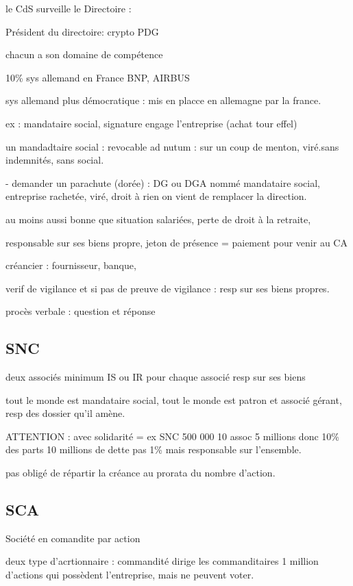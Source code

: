 \documentclass[a4paper,12pt]{article}
\begin{document}
le CdS surveille le Directoire : 

Président du directoire: crypto PDG

chacun a son domaine de compétence

10\% sys allemand en France
BNP, AIRBUS

sys allemand plus démocratique : mis en placce en allemagne par la france.


ex : mandataire social, signature engage l'entreprise (achat tour effel)

un mandadtaire social : revocable ad nutum : sur un coup de menton, viré.sans indemnités, sans social.

- demander un parachute (dorée) :  DG ou DGA nommé mandataire social, entreprise rachetée, viré, droit à rien
on vient de remplacer la direction.

au moins aussi bonne que situation salariées, perte de droit à la retraite,

responsable sur ses biens propre, jeton de présence = paiement pour venir au CA

créancier : fournisseur,  banque,

verif de vigilance et si pas de preuve de vigilance : resp sur ses biens propres. 

procès verbale : question et réponse     

\subsection{SNC}


deux associés minimum
IS ou IR pour chaque associé
resp sur ses biens 

tout le monde est mandataire social, tout le monde est patron et associé gérant,
resp des dossier qu'il amène.


ATTENTION : avec solidarité = ex SNC 500 000 10 assoc 5 millions donc 10\% des parts
10 millions de dette pas 1\% mais responsable sur l'ensemble.

pas obligé de répartir la créance au prorata du nombre d'action.


\subsection{SCA}

Société en comandite par action

deux type d'acrtionnaire : commandité dirige
les commanditaires 1 million d'actions qui possèdent l'entreprise,
mais ne peuvent voter.
\end{document}
